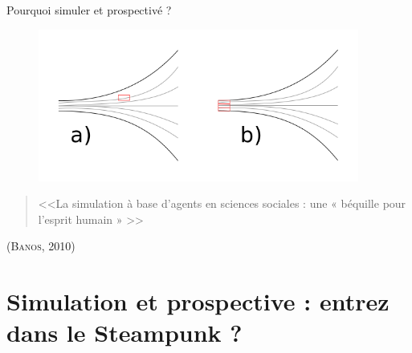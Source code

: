 \documentclass[newPxFont]{beamer}
\begin{document}
\begin{frame}[c]{Pourquoi simuler et prospectivé ?}
  \vspace{-2em}
  \begin{figure}
   \includegraphics[height=5cm]{img/a_prospective_simulation.png}
  \end{figure}
  \vspace{-1em}
  \begin{quote}
    <<La simulation à base d’agents en sciences sociales : une « béquille pour l’esprit humain » >>
  \end{quote}
  \hspace*{\fill}\textsc{(Banos, 2010)}
\end{frame}
%
%
\section{Simulation et prospective : entrez dans le Steampunk ?}
\end{document}
